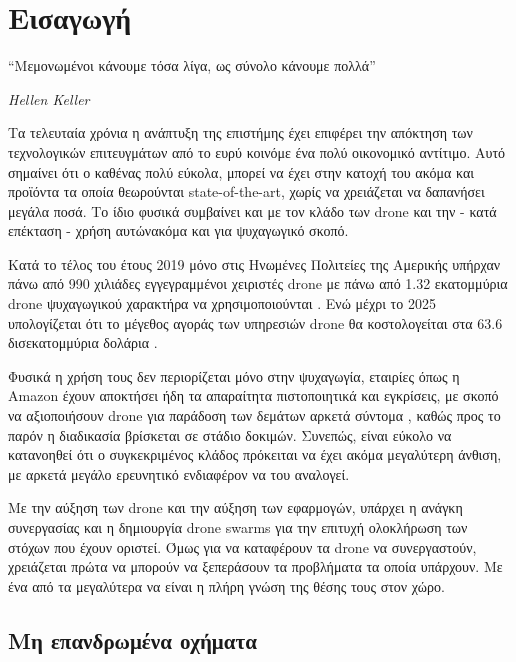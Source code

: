 \chapter{Εισαγωγή} %
\label{chap:Chapter1}  %
\epigraph{``Μεμονωμένοι κάνουμε τόσα λίγα, ως σύνολο κάνουμε πολλά” }{\textit{Hellen Keller}}

Τα τελευταία χρόνια η ανάπτυξη της επιστήμης έχει επιφέρει την απόκτηση των τεχνολογικών επιτευγμάτων 
από το ευρύ κοινό\udot με ένα πολύ οικονομικό αντίτιμο. Αυτό σημαίνει ότι ο καθένας πολύ εύκολα, μπορεί 
να έχει στην κατοχή του ακόμα και προϊόντα τα οποία θεωρούνται state-of-the-art, χωρίς να χρειάζεται να 
δαπανήσει μεγάλα ποσά. Το ίδιο φυσικά συμβαίνει και με τον κλάδο των drone και την - κατά επέκταση - χρήση 
αυτών\udot ακόμα και για ψυχαγωγικό σκοπό.  

Κατά το τέλος του έτους 2019 μόνο στις Ηνωμένες Πολιτείες της Αμερικής υπήρχαν πάνω από 990 χιλιάδες 
εγγεγραμμένοι χειριστές drone με πάνω από 1.32 εκατομμύρια drone ψυχαγωγικού χαρακτήρα να χρησιμοποιούνται 
\cite{2019-drone-statistic}. Ενώ μέχρι το 2025 υπολογίζεται ότι το μέγεθος αγοράς των υπηρεσιών drone θα 
κοστολογείται στα 63.6 δισεκατομμύρια δολάρια \cite{expected-drone-market}.

Φυσικά η χρήση τους δεν περιορίζεται μόνο στην ψυχαγωγία, εταιρίες όπως η Amazon έχουν αποκτήσει ήδη τα 
απαραίτητα πιστοποιητικά και εγκρίσεις, με σκοπό να αξιοποιήσουν drone για παράδοση των δεμάτων αρκετά 
σύντομα \cite{amazon-drones}, καθώς προς το παρόν η διαδικασία βρίσκεται σε στάδιο δοκιμών. Συνεπώς, είναι 
εύκολο να κατανοηθεί ότι ο συγκεκριμένος κλάδος πρόκειται να έχει ακόμα μεγαλύτερη άνθιση, με αρκετά μεγάλο 
ερευνητικό ενδιαφέρον να του αναλογεί.   

Με την αύξηση των drone και την αύξηση των εφαρμογών, υπάρχει η ανάγκη συνε\-ργασίας και η δημιουργία drone swarms 
για την επιτυχή ολοκλήρωση των στόχων που έχουν οριστεί. Όμως για να καταφέρουν τα drone να συνεργαστούν, χρειάζεται 
πρώτα να μπορούν να ξεπεράσουν τα προβλήματα τα οποία υπάρχουν. Με ένα από τα μεγαλύτερα να είναι η πλήρη γνώση της 
θέσης τους στον χώρο.


\section{Μη επανδρωμένα οχήματα} \label{sec:Chapter1-1} 

